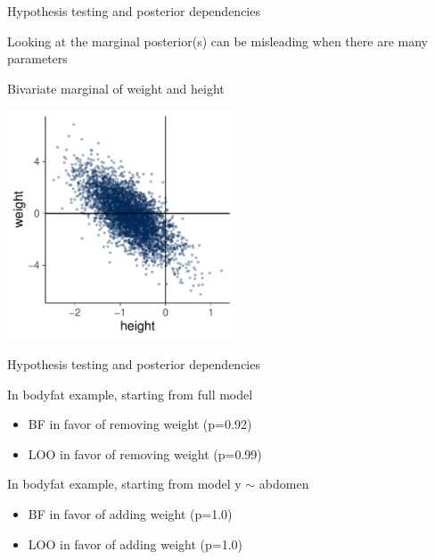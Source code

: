 \documentclass[english,t]{beamer}
\begin{document}
\begin{frame}{Hypothesis testing and posterior dependencies}

  \vspace{-0.75\baselineskip}
  Looking at the marginal posterior(s) can be misleading when there
  are many parameters

  Bivariate marginal of weight and height
  
  \vspace{-0.25\baselineskip}
  \includegraphics[width=6.8cm]{bodyfat_mcmc_scatter.pdf}

\end{frame}

\begin{frame}{Hypothesis testing and posterior dependencies}

  In bodyfat example, starting from full model

  \begin{itemize}
  \item BF in favor of removing weight (p=0.92)
  \item LOO in favor of removing weight (p=0.99)
  \end{itemize}

  In bodyfat example, starting from model y $\sim$ abdomen
  \begin{itemize}
  \item BF in favor of adding weight (p=1.0)
  \item LOO in favor of adding weight (p=1.0)
  \end{itemize}

\end{frame}
\end{document}
